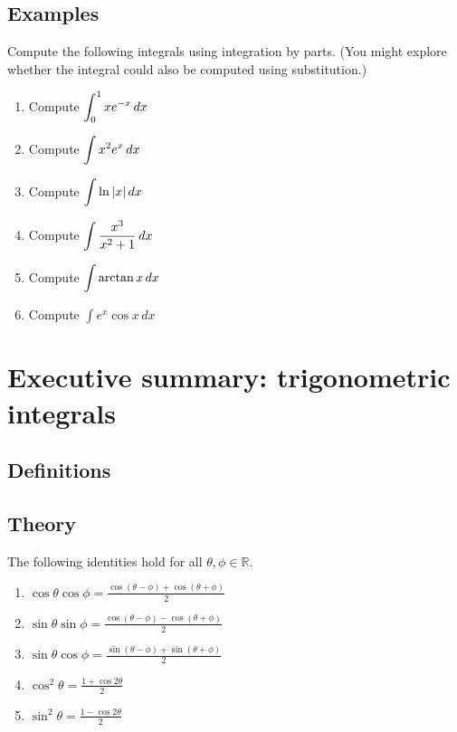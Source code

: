 \subsection*{Examples}
Compute the following integrals using integration by parts. (You might explore whether the integral could also be computed using substitution.)
\begin{enumerate}
  \item Compute $\displaystyle\int_0^1 xe^{-x}\, dx$
  \item Compute $\displaystyle\int x^2e^x\, dx$
  \item Compute $\displaystyle\int \ln \vert x\vert\, dx$
  \item Compute $\displaystyle\int \frac{x^3}{x^2+1}\, dx$
  \item Compute $\displaystyle\int \arctan x\, dx$
  \item Compute $\int e^x\cos x\, dx$
\end{enumerate}




\newpage

\section{Executive summary: trigonometric integrals}

\thispagestyle{fancy}
\subsection*{Definitions}


\subsection*{Theory}
\begin{namedtheorem} The following identities hold for all $\theta, \phi\in\mathbb{R}$.
  \begin{multicols}{2}
    \begin{enumerate}
      \item $\displaystyle\cos\theta\cos\phi=\frac{\cos(\theta-\phi)+\cos(\theta+\phi)}{2}$
      \item $\displaystyle\sin\theta\sin\phi=\frac{\cos(\theta-\phi)-\cos(\theta+\phi)}{2}$
      \item $\displaystyle\sin\theta\cos\phi= \frac{\sin(\theta-\phi)+\sin(\theta+\phi)}{2}$
      \item $\displaystyle\cos^2\theta=\frac{1+\cos2\theta}{2}$
      \item $\displaystyle\sin^2\theta=\frac{1-\cos2\theta}{2}$
    \end{enumerate}
  \end{multicols}

\end{namedtheorem}


